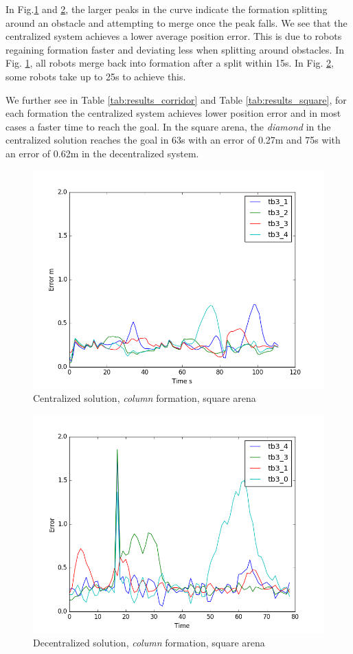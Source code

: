 \documentclass[letterpaper, 10 pt, conference]{ieeeconf}  %
\begin{document}
In Fig.\ref{fig:centralized} and \ref{fig:decentralized}, the larger peaks in the curve indicate the formation splitting around an obstacle and attempting to merge once the peak falls. We see that the centralized system achieves a lower average position error. This is due to robots regaining formation faster and deviating less when splitting around obstacles. In Fig. \ref{fig:centralized}, all robots merge back into formation after a split within 15s. In Fig. \ref{fig:decentralized}, some robots take up to 25s to achieve this. 

We further see in Table \ref{tab:results_corridor} and Table \ref{tab:results_square}, for each formation the centralized system achieves lower position error and in most cases a faster time to reach the goal. In the square arena, the \textit{diamond} in the centralized solution reaches the goal in 63s with an error of 0.27m and 75s with an error of 0.62m in the decentralized system.

\begin{figure}[tb]
\centering
\includegraphics[height=0.6\linewidth]{images/centralized_plot.png}
\caption{Centralized solution, \textit{column} formation, square arena}
\label{fig:centralized}
\end{figure}

\begin{figure}[tb]
\centering
\includegraphics[height=0.6\linewidth]{images/decentalized_plot.png}
\caption{Decentralized solution, \textit{column} formation, square arena}
\label{fig:decentralized}
\end{figure}
\end{document}
